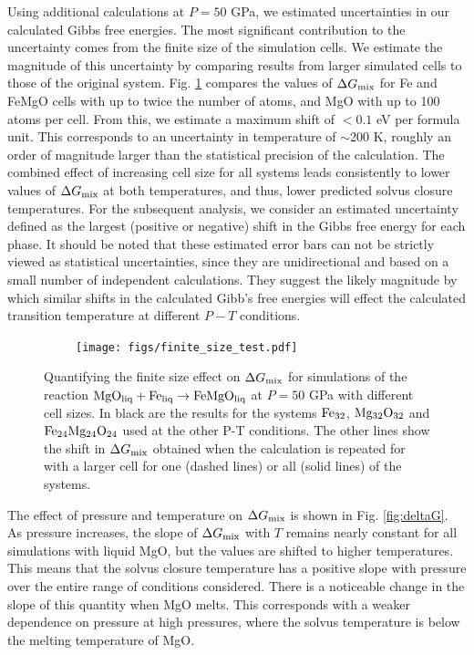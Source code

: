 Using additional calculations at $P=50$  GPa, we estimated uncertainties in our
calculated Gibbs free energies. The most significant contribution to the uncertainty
comes from the finite size of the simulation cells. We estimate the magnitude of this
uncertainty by comparing results from larger simulated cells to those of the original
system. Fig. \ref{fig:finite_size_effect} compares the values of $\Delta G_{\rm mix}$ for
Fe and FeMgO cells with up to twice the number of atoms, and MgO with up to 100 atoms per
cell. From this, we estimate a maximum shift of $<0.1$ eV per formula unit. This
corresponds to an uncertainty in temperature of $\sim$200 K, roughly an order of
magnitude larger than the statistical precision of the calculation. The combined effect
of increasing cell size for all systems leads consistently to lower values of $\Delta
G_{\rm mix}$ at both temperatures, and thus, lower predicted solvus closure temperatures.
For the subsequent analysis, we consider an estimated uncertainty defined as the largest
(positive or negative) shift in the Gibbs free energy for each phase. It should be noted
that these estimated error bars can not be strictly viewed as statistical uncertainties,
since they are unidirectional and based on a small number of independent calculations.
They suggest the likely magnitude by which similar shifts in the calculated Gibb's free
energies will effect the calculated transition temperature at different $P-T$ conditions. 

\begin{figure}[h!]  
  \centering
    \texttt{[image: figs/finite\_size\_test.pdf]}
\caption{Quantifying the finite size effect on $\Delta G_{\rm{mix}}$ for simulations of
the reaction ${ \rm MgO_{liq} + Fe_{liq} } \rightarrow {\rm FeMgO_{liq}}$ at $P=50$ GPa
with different cell sizes. In black are the results for the systems  ${\rm Fe_{32}}$,
${\rm Mg_{32}O_{32}}$ and ${\rm Fe_{24}Mg_{24}O_{24}}$ used at the other P-T conditions.
The other lines show the shift in $\Delta G_{\rm{mix}}$ obtained when the calculation is
repeated for with a larger cell for one (dashed lines) or all (solid lines) of the systems.}
\label{fig:finite_size_effect}
\end{figure}


The effect of pressure and temperature on $\Delta G_{\rm mix}$ is shown in Fig.
\ref{fig:deltaG}. As pressure increases, the slope of $\Delta G_{\rm mix}$ with $T$
remains nearly constant for all simulations with liquid MgO, but the values are shifted to
higher temperatures. This means that the solvus closure temperature has a positive slope
with pressure over the entire range of conditions considered. There is a noticeable
change in the slope of this quantity  when MgO melts.  This corresponds with a weaker
dependence on pressure at high pressures, where the solvus temperature is below the
melting temperature of MgO. 

